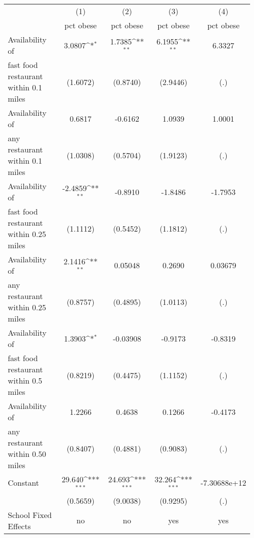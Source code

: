 {
\def\sym#1{\ifmmode^{#1}\else\(^{#1}\)\fi}
\begin{tabular*}{1\linewidth}{@{\hskip\tabcolsep\extracolsep\fill}l*{4}{c}}
\hline\hline
                &\multicolumn{1}{c}{(1)}&\multicolumn{1}{c}{(2)}&\multicolumn{1}{c}{(3)}&\multicolumn{1}{c}{(4)}\\
                &\multicolumn{1}{c}{pct obese}&\multicolumn{1}{c}{pct obese}&\multicolumn{1}{c}{pct obese}&\multicolumn{1}{c}{pct obese}\\
\hline
Availability of &   3.0807\sym{*}  &   1.7385\sym{**} &   6.1955\sym{**} &   6.3327         \\
fast food restaurant within 0.1 miles& (1.6072)         & (0.8740)         & (2.9446)         &      (.)         \\
[1em]
Availability of &   0.6817         &  -0.6162         &   1.0939         &   1.0001         \\
any restaurant within 0.1 miles& (1.0308)         & (0.5704)         & (1.9123)         &      (.)         \\
[1em]
Availability of &  -2.4859\sym{**} &  -0.8910         &  -1.8486         &  -1.7953         \\
fast food restaurant within 0.25 miles& (1.1112)         & (0.5452)         & (1.1812)         &      (.)         \\
[1em]
Availability of &   2.1416\sym{**} &  0.05048         &   0.2690         &  0.03679         \\
any restaurant within 0.25 miles& (0.8757)         & (0.4895)         & (1.0113)         &      (.)         \\
[1em]
Availability of &   1.3903\sym{*}  & -0.03908         &  -0.9173         &  -0.8319         \\
fast food restaurant within 0.5 miles& (0.8219)         & (0.4475)         & (1.1152)         &      (.)         \\
[1em]
Availability of &   1.2266         &   0.4638         &   0.1266         &  -0.4173         \\
any restaurant within 0.50 miles& (0.8407)         & (0.4881)         & (0.9083)         &      (.)         \\
[1em]
Constant        &   29.640\sym{***}&   24.693\sym{***}&   32.264\sym{***}&-7.30688e+12         \\
                & (0.5659)         & (9.0038)         & (0.9295)         &      (.)         \\
\hline
School Fixed Effects&       no         &       no         &      yes         &      yes         \\

\end{tabular*}}
